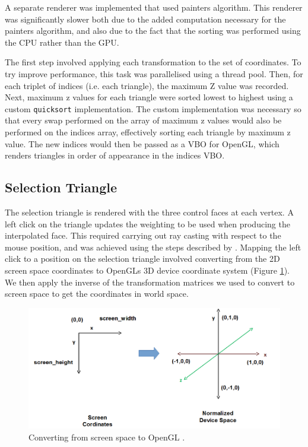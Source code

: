 \documentclass[12pt]{article}
\begin{document}
A separate renderer was implemented that used painters algorithm.
This renderer was significantly slower both due to the added computation necessary for the painters algorithm, and also due to the fact that the sorting was performed using the CPU rather than the GPU.

The first step involved applying each transformation to the set of coordinates. 
To try improve performance, this task was parallelised using a thread pool.
Then, for each triplet of indices (i.e. each triangle), the maximum Z value was recorded.
Next, maximum z values for each triangle were sorted lowest to highest using a custom \texttt{quicksort} implementation.
The custom implementation was necessary so that every swap performed on the array of maximum z values would also be performed on the indices array, effectively sorting each triangle by maximum z value.
The new indices would then be passed as a VBO for OpenGL, which renders triangles in order of appearance in the indices VBO.


\subsection{Selection Triangle}

The selection triangle is rendered with the three control faces at each vertex.
A left click on the triangle updates the weighting to be used when producing the interpolated face.
This required carrying out ray casting with respect to the mouse position, and was achieved using the steps described by \cite{screenspace}.
Mapping the left click to a position on the selection triangle involved converting from the 2D screen space coordinates to OpenGLs 3D device coordinate system (Figure \ref{fig:screen_coordinates}).
We then apply the inverse of the transformation matrices we used to convert to screen space to get the coordinates in world space.

\begin{figure}[!ht]
	\centering
	\includegraphics[width=\linewidth]{images/screen_coordinates.png}
    \caption{Converting from screen space to OpenGL \cite{lwjglgamedev}.}
	\label{fig:screen_coordinates}
\end{figure}
\end{document}
